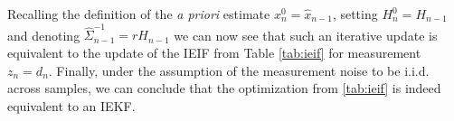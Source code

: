 % 
Recalling the definition of the \textit{a priori} estimate $x_n^0 = \hat{x}_{n - 1}$, setting $H_n^0 = H_{n-1}$ and denoting $\hat{\Sigma}_{n-1}^{-1} = r H_{n - 1}$ we can now see that such an iterative update is equivalent to the update of the IEIF from Table \ref{tab:ieif} for measurement $z_n = d_n$. Finally, under  the assumption of the measurement noise to be i.i.d. across samples, we can conclude that the optimization from \ref{tab:ieif} is indeed equivalent to an IEKF.

% 